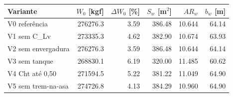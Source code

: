 \begin{tabular}{lrrrrr}
\toprule
Variante & $W_0$ [kgf] & $\Delta W_0$ [\%] & $S_w$ [m$^2$] & $AR_w$ & $b_w$ [m] \\
\midrule
V0 referência & 276276.3 & 3.59 & 386.48 & 10.644 & 64.14 \\
V1 sem C\_Lv & 273335.3 & 4.62 & 382.90 & 10.674 & 63.93 \\
V2 sem envergadura & 276276.3 & 3.59 & 386.48 & 10.644 & 64.14 \\
V3 sem tanque & 268830.1 & 6.19 & 320.00 & 11.485 & 60.62 \\
V4 Cht até 0,50 & 271594.5 & 5.22 & 381.22 & 11.049 & 64.90 \\
V5 sem trem-na-asa & 274726.8 & 4.13 & 384.29 & 10.960 & 64.90 \\
\bottomrule
\end{tabular}